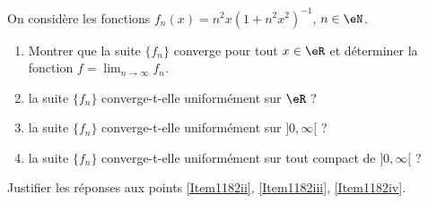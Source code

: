 


\begin{exercice}\label{exo1182}

	On considère les fonctions $f_n(x)=n^2x(1+n^2x^2)^{-1}$, $n\in\eN$.
	\begin{enumerate}
		\item Montrer que la suite $\{ f_n \}$ converge pour tout $x\in\eR$ et déterminer la fonction $f=\lim_{n\to\infty}f_n$.
		\item\label{Item1182ii} la suite $\{ f_n \}$ converge-t-elle uniformément sur $\eR$ ?
		\item\label{Item1182iii} la suite $\{ f_n \}$ converge-t-elle uniformément sur $]0,\infty[$ ?
		\item\label{Item1182iv} la suite $\{ f_n \}$ converge-t-elle uniformément sur tout compact de $]0,\infty[$ ?
	\end{enumerate}
	Justifier les réponses aux points \ref{Item1182ii}, \ref{Item1182iii}, \ref{Item1182iv}.

\end{exercice}
